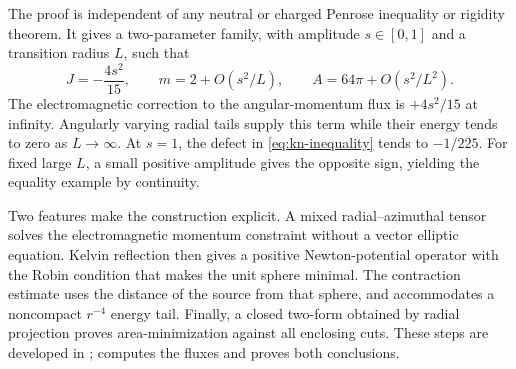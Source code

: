 The proof is independent of any neutral or charged Penrose inequality or
rigidity theorem. It gives a two-parameter family, with amplitude
\(s\in[0,1]\) and a transition radius \(L\), such that
\begin{equation}\label{eq:family-summary}
 J=-\frac{4s^2}{15},\qquad
 m=2+O(s^2/L),\qquad
 A=64\pi+O(s^2/L^2).
\end{equation}
The electromagnetic correction to the angular-momentum flux is
\(+4s^2/15\) at infinity. Angularly varying radial tails supply this term
while their energy tends to zero as \(L\to\infty\). At \(s=1\), the defect
in \eqref{eq:kn-inequality} tends to \(-1/225\). For fixed large \(L\), a
small positive amplitude gives the opposite sign, yielding the equality
example by continuity.

Two features make the construction explicit. A mixed radial--azimuthal
tensor solves the electromagnetic momentum constraint without a vector
elliptic equation. Kelvin reflection then gives a positive Newton-potential
operator with the Robin condition that makes the unit sphere minimal.
The contraction estimate uses the distance of the source from that sphere,
and accommodates a noncompact \(r^{-4}\) energy tail. Finally, a closed
two-form obtained by radial projection proves area-minimization against
all enclosing cuts. These steps are developed in
;
 computes the fluxes and proves both conclusions.
